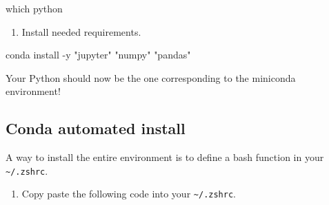 \documentclass[]{article}
\newenvironment{Shaded}{\begin{snugshade}}{\end{snugshade}}
\newcommand{\NormalTok}[1]{\textcolor[rgb]{0.81,0.81,0.76}{#1}}
\providecommand{\tightlist}{%
  \setlength{\itemsep}{0pt}\setlength{\parskip}{0pt}}
\begin{document}
\begin{Shaded}
\begin{Highlighting}[]
\NormalTok{which python}
\end{Highlighting}
\end{Shaded}

\begin{enumerate}
\def\labelenumi{\arabic{enumi}.}
\setcounter{enumi}{5}
\tightlist
\item
  Install needed requirements.
\end{enumerate}

\begin{Shaded}
\begin{Highlighting}[]
\NormalTok{conda install -y "jupyter" "numpy" "pandas"}
\end{Highlighting}
\end{Shaded}

Your Python should now be the one corresponding to the miniconda
environment!

\hypertarget{conda-automated-install}{%
\subsection{Conda automated install}\label{conda-automated-install}}

A way to install the entire environment is to define a bash function in
your \texttt{\textasciitilde{}/.zshrc}.

\begin{enumerate}
\def\labelenumi{\arabic{enumi}.}
\tightlist
\item
  Copy paste the following code into your
  \texttt{\textasciitilde{}/.zshrc}.
\end{enumerate}
\end{document}
